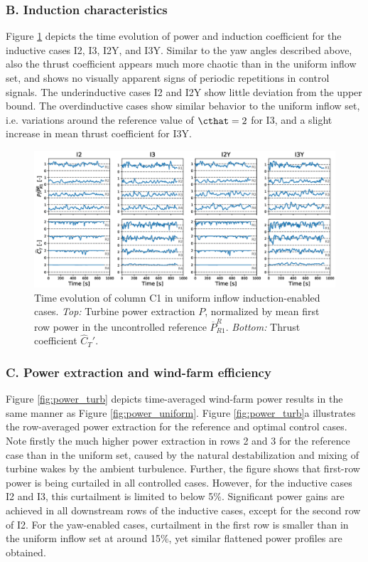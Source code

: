	\subsubsection{B. Induction characteristics}
	Figure \ref{fig:dynamic_ctfilt_turb} depicts the time evolution of power and induction coefficient for the inductive cases I2, I3, I2Y, and I3Y. Similar to the yaw angles described above, also the thrust coefficient appears much more chaotic than in the uniform inflow set, and shows no visually apparent signs of periodic repetitions in control signals. The underinductive cases I2 and I2Y show little deviation from the upper bound. The overdinductive cases show similar behavior to the uniform inflow set, i.e. variations around the reference value of $\cthat = 2$ for I3, and a slight increase in mean thrust coefficient for I3Y. 
	\begin{figure}
		\includegraphics[width=\textwidth]{chapters/optimal_yaw_control/power_ctfilt_turb.eps}	
		\caption{Time evolution of column C1 in uniform inflow induction-enabled cases. \emph{Top: } Turbine power extraction $P$, normalized by mean first row power in the uncontrolled reference $\overline{P}_{R1}^R$. \emph{Bottom: } Thrust coefficient $\widehat{C}_T'$. \label{fig:dynamic_ctfilt_turb}}
	\end{figure}
	

	\subsubsection{C. Power extraction and wind-farm efficiency}
	Figure \ref{fig:power_turb} depicts time-averaged wind-farm power results in the same manner as Figure \ref{fig:power_uniform}. Figure \ref{fig:power_turb}a illustrates the row-averaged power extraction for the reference and optimal control cases. Note firstly the much higher power extraction in rows 2 and 3 for the reference case than in the uniform set, caused by the natural destabilization and mixing of turbine wakes by the ambient turbulence. Further, the figure shows that first-row power is being curtailed in all controlled cases. However, for the inductive cases I2 and I3, this curtailment is limited to below 5\%. Significant power gains are achieved in all downstream rows of the inductive cases, except for the second row of I2. For the yaw-enabled cases, curtailment in the first row is smaller than in the uniform inflow set at around 15\%, yet similar flattened power profiles are obtained. 
	
